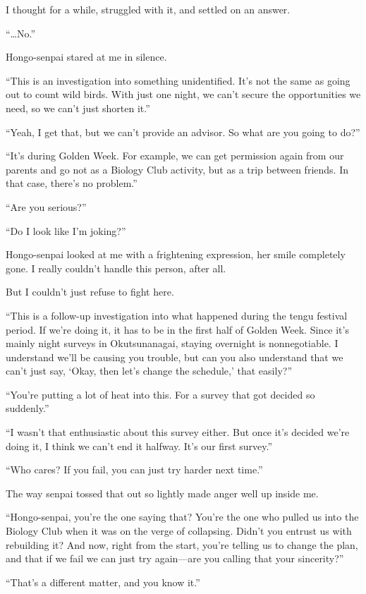 \documentclass[
    a4paper,
    12pt,
    twoside,
    openany,
    UTF8,
    fontset=windows
]{ctexbook}
\begin{document}
I thought for a while, struggled with it, and settled on an answer.

``\dots No.''

Hongo-senpai stared at me in silence.

``This is an investigation into something unidentified. It's not the same as going out to count wild birds. With just one night, we can't secure the opportunities we need, so we can't just shorten it.''

``Yeah, I get that, but we can't provide an advisor. So what are you going to do?''

``It's during Golden Week. For example, we can get permission again from our parents and go not as a Biology Club activity, but as a trip between friends. In that case, there's no problem.''

``Are you serious?''

``Do I look like I'm joking?''

Hongo-senpai looked at me with a frightening expression, her smile completely gone. I really couldn't handle this person, after all.

But I couldn't just refuse to fight here.

``This is a follow-up investigation into what happened during the tengu festival period. If we're doing it, it has to be in the first half of Golden Week. Since it's mainly night surveys in Okutsunanagai, staying overnight is nonnegotiable. I understand we'll be causing you trouble, but can you also understand that we can't just say, `Okay, then let's change the schedule,' that easily?''

``You're putting a lot of heat into this. For a survey that got decided so suddenly.''

``I wasn't that enthusiastic about this survey either. But once it's decided we're doing it, I think we can't end it halfway. It's our first survey.''

``Who cares? If you fail, you can just try harder next time.''

The way senpai tossed that out so lightly made anger well up inside me.

``Hongo-senpai, you're the one saying that? You're the one who pulled us into the Biology Club when it was on the verge of collapsing. Didn't you entrust us with rebuilding it? And now, right from the start, you're telling us to change the plan, and that if we fail we can just try again---are you calling that your sincerity?''

``That's a different matter, and you know it.''
\end{document}
